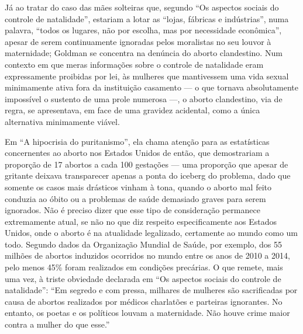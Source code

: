 Já ao
tratar do caso das mães solteiras que, segundo ``Os aspectos sociais
do controle de natalidade'', estariam a lotar as ``lojas, fábricas e
indústrias'', numa palavra, ``todos os lugares, não por escolha, mas por
necessidade econômica'', apesar de serem continuamente ignoradas pelos
moralistas no seu louvor à maternidade; Goldman se concentra na denúncia
do aborto clandestino. Num contexto em que meras informações sobre o
controle de natalidade eram expressamente proibidas por lei, às mulheres
que mantivessem uma vida sexual minimamente ativa fora da instituição
casamento --- o que tornava absolutamente impossível o sustento de uma
prole numerosa ---, o aborto clandestino, via de regra, se apresentava,
em face de uma gravidez acidental, como a única alternativa minimamente
viável. 

Em ``A hipocrisia do puritanismo'', ela chama atenção para as
estatísticas concernentes ao aborto nos Estados Unidos de então, que
demostrariam a proporção de 17 abortos a cada 100 gestações --- uma
proporção que apesar de gritante deixava transparecer apenas a ponta do
iceberg do problema, dado que somente os casos mais drásticos vinham à
tona, quando o aborto mal feito conduzia ao óbito ou a problemas de
saúde demasiado graves para serem ignorados. Não é preciso dizer que
esse tipo de consideração permanece extremamente atual, se não no que
diz respeito especificamente aos Estados Unidos, onde o aborto é na
atualidade legalizado, certamente ao mundo como um todo. Segundo dados
da Organização Mundial de Saúde, por exemplo, dos 55 milhões de abortos
induzidos ocorridos no mundo entre os anos de 2010 a 2014, pelo menos
45\% foram realizados em condições precárias. O que remete, mais uma
vez, à triste obviedade declarada em ``Os aspectos sociais do controle
de natalidade'': ``Em segredo e com pressa, milhares de mulheres são
sacrificadas por causa de abortos realizados por médicos charlatões e
parteiras ignorantes. No entanto, os poetas e os políticos louvam a
maternidade. Não houve crime maior contra a mulher do que esse.''

